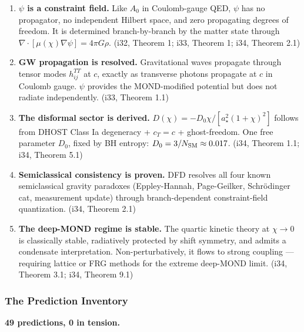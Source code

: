 \documentclass[11pt,a4paper]{article}
\begin{document}
\begin{enumerate}
\item \textbf{$\psi$ is a constraint field.} Like $A_0$ in Coulomb-gauge QED, $\psi$ has no propagator, no independent Hilbert space, and zero propagating degrees of freedom. It is determined branch-by-branch by the matter state through $\nabla\cdot[\mu(\chi)\nabla\psi] = 4\pi G\rho$. (i32, Theorem 1; i33, Theorem 1; i34, Theorem 2.1)

\item \textbf{GW propagation is resolved.} Gravitational waves propagate through tensor modes $h_{ij}^{TT}$ at $c$, exactly as transverse photons propagate at $c$ in Coulomb gauge. $\psi$ provides the MOND-modified potential but does not radiate independently. (i33, Theorem 1.1)

\item \textbf{The disformal sector is derived.} $D(\chi) = -D_0\chi/[a_\star^2(1+\chi)^2]$ follows from DHOST Class Ia degeneracy + $c_T = c$ + ghost-freedom. One free parameter $D_0$, fixed by BH entropy: $D_0 = 3/N_{\rm SM} \approx 0.017$. (i34, Theorem 1.1; i34, Theorem 5.1)

\item \textbf{Semiclassical consistency is proven.} DFD resolves all four known semiclassical gravity paradoxes (Eppley-Hannah, Page-Geilker, Schr\"odinger cat, measurement update) through branch-dependent constraint-field quantization. (i34, Theorem 2.1)

\item \textbf{The deep-MOND regime is stable.} The quartic kinetic theory at $\chi \to 0$ is classically stable, radiatively protected by shift symmetry, and admits a condensate interpretation. Non-perturbatively, it flows to strong coupling --- requiring lattice or FRG methods for the extreme deep-MOND limit. (i34, Theorem 3.1; i34, Theorem 9.1)
\end{enumerate}

\subsubsection{The Prediction Inventory}

\textbf{49 predictions, 0 in tension.}
\end{document}
